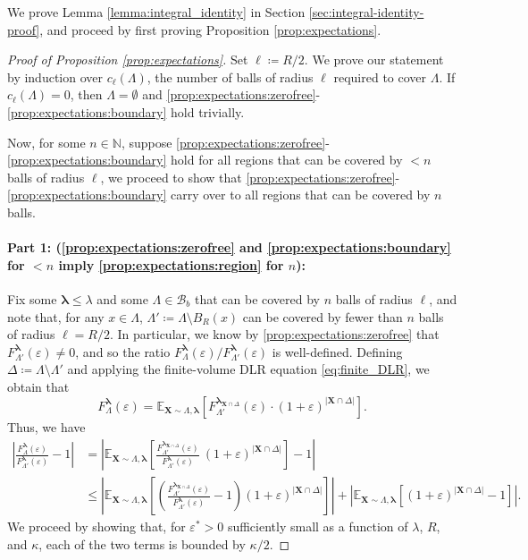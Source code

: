 \documentclass[10pt]{amsart}
\theoremstyle{definition}
\theoremstyle{remark}
\newcommand{\bX}{\mathbf{X}}
\newcommand{\E}{\mathbb{E}}
\newcommand{\N}{\mathbb{N}}
\newcommand{\region}{\Lambda}
\newcommand{\activity}{\lambda}
\newcommand{\activities}{\pmb{\lambda}}
\newcommand{\borel}{\mathcal{B}}
\newcommand{\size}[1]{\left\lvert#1\right\rvert}
\newcommand{\absolute}[1]{\left\lvert#1\right\rvert}
\newcommand{\epsbound}{\varepsilon^{*}}
\begin{document}
	
	We prove Lemma \ref{lemma:integral_identity} in Section \ref{sec:integral-identity-proof}, and proceed by first proving Proposition \ref{prop:expectations}.  
	\begin{proof}[Proof of Proposition \ref{prop:expectations}]
		Set $\ell \coloneqq R/2$. 
		We prove our statement by induction over $c_{\ell}(\region)$, the number of balls of radius $\ell$ required to cover $\region$.
		If $c_{\ell}(\region) = 0$, then $\region = \emptyset$ and \ref{prop:expectations:zerofree}-\ref{prop:expectations:boundary} hold trivially.
		
		Now, for some $n \in \N$, suppose \ref{prop:expectations:zerofree}-\ref{prop:expectations:boundary} hold for all regions that can be covered by $<n$ balls of radius $\ell$, we proceed to show that \ref{prop:expectations:zerofree}-\ref{prop:expectations:boundary} carry over to all regions that can be covered by $n$ balls.
		
		\medskip 
		\paragraph{\texorpdfstring{\textbf{Part 1: (\ref{prop:expectations:zerofree} and \ref{prop:expectations:boundary} for $< n$ imply \ref{prop:expectations:region} for $n$):}}{Part  1: ((i) and (iv) for < n imply (ii) for n)}}
		Fix some $\activities \le \activity$ and some $\region \in \borel_b$ that can be covered by $n$ balls of radius $\ell$, and note that, for any $x \in \region$, $\region' \coloneqq \region \setminus B_{R}(x)$ can be covered by fewer than $n$ balls of radius $\ell = R/2$. 
		In particular, we know by \ref{prop:expectations:zerofree} that $F_{\region'}^{\activities}(\varepsilon) \neq 0$, and so the ratio $F_{\region}^{\activities}(\varepsilon) / F_{\region'}^{\activities}(\varepsilon)$ is well-defined. Defining $\Delta \coloneqq \region \setminus \region'$ and 
		applying the finite-volume DLR equation \eqref{eq:finite_DLR}, we obtain that
		\[
		F_{\region}^{\activities}(\varepsilon)
		= \E_{\bX \sim \region, \activities} [ F_{\region'}^{\activities_{\bX \cap \Delta}}(\varepsilon) \cdot (1 + \varepsilon)^{\size{\bX \cap \Delta}}].
		\]
		Thus, we have 
		\begin{align}\label{eq:twoterms}
			\absolute{\frac{F_{\region}^{\activities}(\varepsilon)}{F_{\region'}^{\activities}(\varepsilon)} - 1} 
			&= \absolute{\E_{\bX \sim \region, \activities} \left[\frac{F_{\region'}^{\activities_{\bX \cap\Delta}}(\varepsilon)}{F_{\region'}^{\activities}(\varepsilon)}\  (1 + \varepsilon)^{\size{\bX \cap \Delta}} \right] - 1} \nonumber \\
			&\le \absolute{\E_{\bX \sim \region, \activities} \left[\left(\frac{F_{\region'}^{\activities_{\bX \cap\Delta}}(\varepsilon)}{F_{\region'}^{\activities}(\varepsilon)} - 1\right)  (1 + \varepsilon)^{\size{\bX \cap \Delta}} \right]}  
			+ \absolute{\E_{\bX \sim \region, \activities}[(1 + \varepsilon)^{\size{\bX \cap \Delta}} - 1]} .
		\end{align}
		We proceed by showing that, for $\epsbound > 0$ sufficiently small as a function of $\activity$, $R$, and $\kappa$, each of the two terms is bounded by $\kappa/2$.
		

\end{proof}
\end{document}
